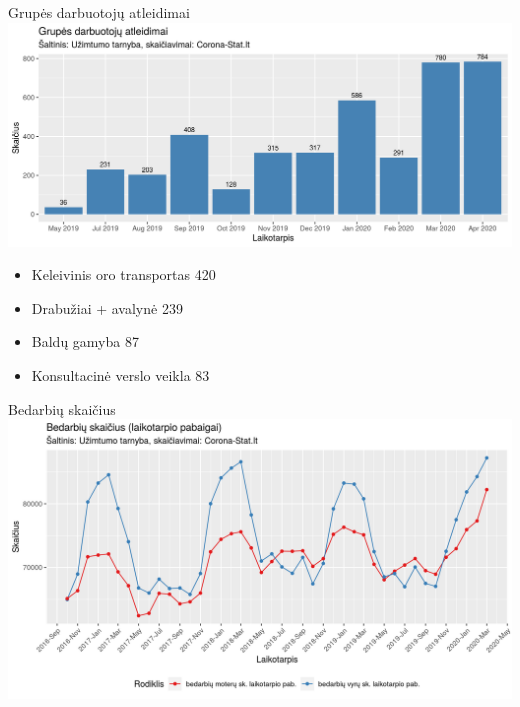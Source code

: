 \documentclass[11pt]{beamer}
\begin{document}
\begin{frame}{Grupės darbuotojų atleidimai}
\includegraphics[scale=0.5]{grupes_darbuotoju_atleidimai_men_sum.png}
\begin{footnotesize}
\begin{itemize}
\item Keleivinis oro transportas	420
\item Drabužiai + avalynė 239
\item Baldų gamyba	87
\item Konsultacinė verslo veikla	83
\end{itemize}
\end{footnotesize}
\end{frame}


%

\begin{frame}{Bedarbių skaičius}
\includegraphics[scale=0.5]{bedarbiu_sk.png}
\end{frame}

\end{document}
